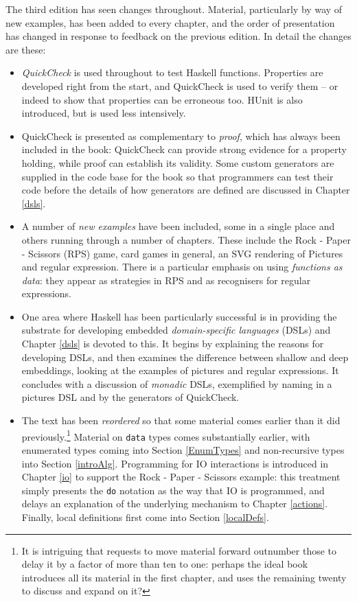 The third edition has seen changes throughout. Material, particularly by way of new examples, has been added to every chapter, and the order of presentation has changed in response to feedback on the previous edition. In detail the changes are these:
\begin{itemize}
\item
\emph{QuickCheck} is used throughout to test Haskell functions. Properties are developed right from the start, and QuickCheck is used to verify them -- or indeed to show that properties can be erroneous too. HUnit is also introduced, but is used less intensively.

\item
QuickCheck is presented as complementary to \emph{proof}, which has always been included in the book: QuickCheck can provide strong evidence for a property holding, while proof can establish its validity. Some custom generators are supplied in the code base for the book so that programmers can test their code before the details of how generators are defined are discussed in Chapter \ref{dsls}.

\item
A number of \emph{new examples} have been included, some in a single place and others running through a number of chapters. These include the Rock - Paper - Scissors (RPS) game, card games in general, an SVG rendering of Pictures and regular expression. There is a particular emphasis on using \emph{functions as data}: they appear as strategies in RPS and as recognisers for regular expressions.

\item
One area where Haskell has been particularly successful is in providing the substrate for developing embedded \emph{domain-specific languages} (DSLs) and Chapter \ref{dsls} is devoted to this. It begins by explaining the reasons for developing DSLs, and then examines the difference between shallow and deep embeddings, looking at the examples of pictures and regular expressions. It concludes with a discussion of \emph{monadic} DSLs, exemplified by naming in a pictures DSL and by the generators of QuickCheck.

\item
The text has been \emph{reordered} so that some material comes earlier than it did previously.\footnote{It is intriguing that requests to move material forward outnumber those to delay it by a factor of more than ten to one: perhaps the ideal book introduces all its material in the first chapter, and uses the remaining twenty to discuss and expand on it?} Material on \texttt{data} types comes substantially earlier, with enumerated types coming into Section \ref{EnumTypes} and non-recursive types into Section \ref{introAlg}. Programming for IO interactions is introduced in Chapter \ref{io} to support the Rock - Paper - Scissors example: this treatment simply presents the \texttt{do} notation as the way that IO is programmed, and delays an explanation of the underlying mechanism to Chapter \ref{actions}. Finally, local definitions first come into Section \ref{localDefs}. 


\end{itemize}
